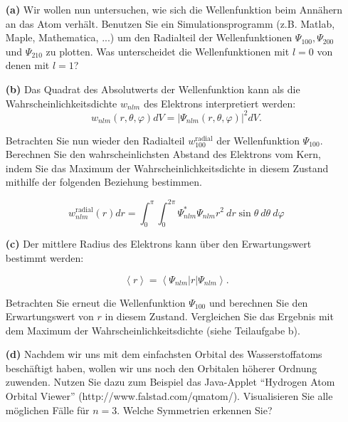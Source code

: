 \vspace{0.2cm}

\begin{itemize}

	\item[\textbf{(a)}] Wir wollen nun untersuchen, wie sich die Wellenfunktion beim Annähern an das Atom verhält. Benutzen Sie ein Simulationsprogramm (z.B. Matlab, Maple, Mathematica, ...) um den Radialteil der Wellenfunktionen $\Psi_{100}, \Psi_{200}$ und $\Psi_{210}$ zu plotten. Was unterscheidet die Wellenfunktionen mit $l=0$ von denen mit $l=1$?

	\item[\textbf{(b)}] Das Quadrat des Absolutwerts der Wellenfunktion kann als die Wahrscheinlichkeitsdichte $w_{nlm}$ des Elektrons interpretiert werden:
\begin{equation*}
	w_{nlm}(r, \theta, \varphi) dV =\left|\Psi_{nlm}(r, \theta, \varphi) \right|^2 dV.
\end{equation*}

Betrachten Sie nun wieder den Radialteil $w_{100}^{\text{radial}}$ der Wellenfunktion $\Psi_{100}$. 
Berechnen Sie den wahrscheinlichsten Abstand des Elektrons vom Kern, indem Sie das Maximum der Wahrscheinlichkeitsdichte in diesem Zustand mithilfe der folgenden Beziehung bestimmen.

\begin{equation*}
w_{nlm}^{\text{radial}} (r) dr = \int_0^{\pi}\int_0^{2\pi}\Psi_{nlm}^{*} \Psi_{nlm} r^2~dr \sin \theta ~ d\theta~ d\varphi
\end{equation*}
	


	\item[\textbf{(c)}] Der mittlere Radius des Elektrons kann über den Erwartungswert bestimmt werden:

\begin{equation*}
\left\langle r \right\rangle = \left\langle \Psi_{nlm} \left| r \right| \Psi_{nlm} \right\rangle.
\end{equation*}

Betrachten Sie erneut die Wellenfunktion $\Psi_{100}$ und berechnen Sie den Erwartungswert von $r$ in diesem Zustand. Vergleichen Sie das Ergebnis mit dem Maximum der Wahrscheinlichkeitsdichte (siehe Teilaufgabe b).	
	
	\item[\textbf{(d)}] Nachdem wir uns mit dem einfachsten Orbital des Wasserstoffatoms beschäftigt haben, wollen wir uns noch den Orbitalen höherer Ordnung zuwenden. Nutzen Sie dazu zum Beispiel das Java-Applet "`Hydrogen Atom Orbital Viewer"' (http://www.falstad.com/qmatom/). Visualisieren Sie alle möglichen Fälle für $n=3$. Welche Symmetrien erkennen Sie?
	
\end{itemize}
	





